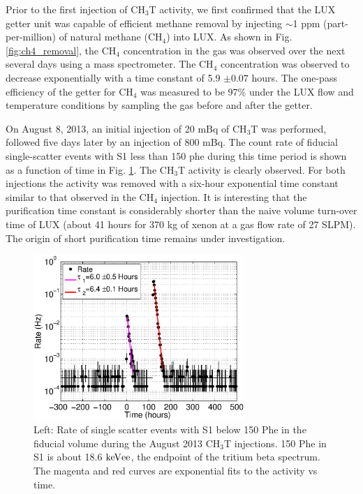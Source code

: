 Prior to the first injection of CH$_3$T activity, we first confirmed that the LUX getter unit was capable of efficient methane removal by injecting  $\sim$1 ppm (part-per-million) of natural methane (CH$_4$) into LUX. As shown in Fig. \ref{fig:ch4_removal}, the CH$_4$ concentration in the gas was observed over the next several days using a mass spectrometer. The CH$_4$ concentration was observed to decrease exponentially with a time constant of 5.9 $\pm 0.07$ hours. The one-pass efficiency of the getter for CH$_4$ was measured to be 97\% under the LUX flow and temperature conditions by sampling the gas before and after the getter. 

On August 8, 2013, an initial injection of 20 mBq of CH$_3$T was performed, followed five days later by an injection of 800 mBq.
The count rate of fiducial single-scatter events with S1 less than 150 phe during this time period is shown as a function of time in Fig. \ref{fig:ch3t_removal}. The CH$_3$T activity is clearly observed. For both injections the activity was removed with a six-hour exponential time constant similar to that observed in the CH$_4$ injection. It is interesting that the purification time constant is considerably shorter than the naive volume turn-over time of LUX (about 41 hours for 370 kg of xenon at a gas flow rate of 27 SLPM).  The origin of short purification time remains under investigation.

\begin{figure}[h!]\centering
\includegraphics[width=80mm]{CH3T_Rate_fid_150_Run03_Tritium_Rate.eps}
\caption{Left: Rate of single scatter events with S1 below 150 Phe in the fiducial volume during the August 2013 CH$_3$T injections. 150 Phe in S1 is about 18.6 $\rm keV{ee}$, the endpoint of the tritium beta spectrum. The magenta and red curves are exponential fits to the activity vs time.}
\label{fig:ch3t_removal}
\end{figure}

